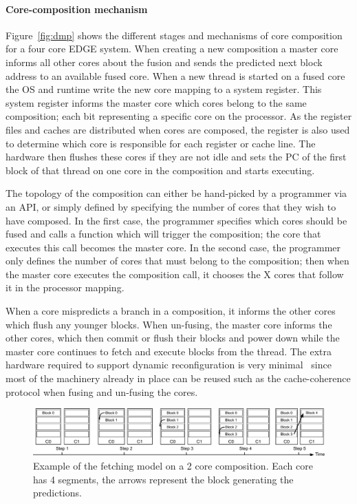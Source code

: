 \paragraph*{Core-composition mechanism}
Figure~\ref{fig:dmp} shows the different stages and mechanisms of core composition for a four core EDGE system.
When creating a new composition a master core informs all other cores about the fusion and sends the predicted next block address to an available fused core.
When a new thread is started on a fused core the OS and runtime write the new core mapping to a system register.
This system register informs the master core which cores belong to the same composition; each bit representing a specific core on the processor.
As the register files and caches are distributed when cores are composed, the register is also used to determine which core is responsible for each register or cache line.
The hardware then flushes these cores if they are not idle and sets the PC of the first block of that thread on one core in the composition and starts executing.

The topology of the composition can either be hand-picked by a programmer via an API, or simply defined by specifying the number of cores that they wish to have composed.
In the first case, the programmer specifies which cores should be fused and calls a function which will trigger the composition; the core that executes this call becomes the master core.
In the second case, the programmer only defines the number of cores that must belong to the composition; then when the master core executes the composition call, it chooses the X cores that follow it in the processor mapping.

When a core mispredicts a branch in a composition, it informs the other cores which flush any younger blocks.
When un-fusing, the master core informs the other cores, which then commit or flush their blocks and power down while the master core continues to fetch and execute blocks from the thread.
The extra hardware required to support dynamic reconfiguration is very minimal~\cite{kim2007tflex} since most of the machinery already in place can be reused such as the cache-coherence protocol when fusing and un-fusing the cores.

\begin{figure}[t]
    \centering
    \includegraphics[width=1\textwidth]{chapter3/graphics/normfetch.pdf}
    \caption{Example of the fetching model on a 2 core composition. Each core has 4 segments, the arrows represent the block generating the predictions.}
   \label{fig:old_fetch}
\end{figure}

